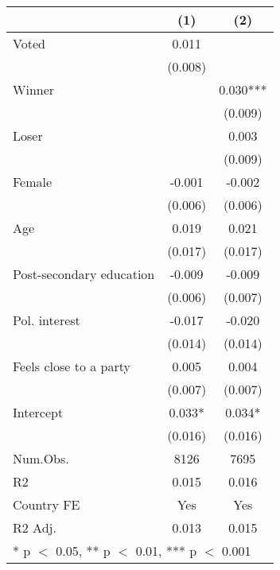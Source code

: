 \begin{table}
\centering
\begin{tabular}[t]{lcc}
\toprule
  & (1) & (2)\\
\midrule
Voted & 0.011 & \\
 & (0.008) & \\
Winner &  & 0.030***\\
 &  & \vphantom{1} (0.009)\\
Loser &  & 0.003\\
 &  & (0.009)\\
Female & -0.001 & -0.002\\
 & (0.006) & (0.006)\\
Age & 0.019 & 0.021\\
 & (0.017) & (0.017)\\
Post-secondary education & -0.009 & -0.009\\
 & (0.006) & (0.007)\\
Pol. interest & -0.017 & -0.020\\
 & (0.014) & (0.014)\\
Feels close to a party & 0.005 & 0.004\\
 & (0.007) & (0.007)\\
Intercept & 0.033* & 0.034*\\
 & (0.016) & (0.016)\\
\midrule
Num.Obs. & 8126 & 7695\\
R2 & 0.015 & 0.016\\
Country FE & Yes & Yes\\
R2 Adj. & 0.013 & 0.015\\
\bottomrule
\multicolumn{3}{l}{\rule{0pt}{1em}* p $<$ 0.05, ** p $<$ 0.01, *** p $<$ 0.001}\\
\end{tabular}
\end{table}
